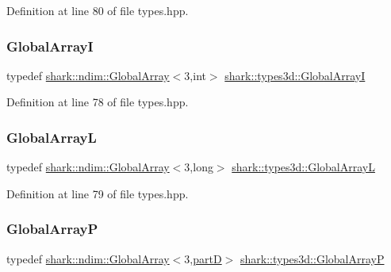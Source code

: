 Definition at line 80 of file types.\+hpp.

\hypertarget{namespaceshark_1_1types3d_a7f31ca9637cd289d819d1d736513dfc0}{}\label{namespaceshark_1_1types3d_a7f31ca9637cd289d819d1d736513dfc0} 
\subsubsection{\texorpdfstring{Global\+ArrayI}{GlobalArrayI}}
{\footnotesize\ttfamily typedef \hyperlink{classshark_1_1ndim_1_1_global_array}{shark\+::ndim\+::\+Global\+Array}$<$3,int$>$ \hyperlink{namespaceshark_1_1types3d_a7f31ca9637cd289d819d1d736513dfc0}{shark\+::types3d\+::\+Global\+ArrayI}}



Definition at line 78 of file types.\+hpp.

\hypertarget{namespaceshark_1_1types3d_a931d8d19c72c6e4deb52443dd3fa4c3f}{}\label{namespaceshark_1_1types3d_a931d8d19c72c6e4deb52443dd3fa4c3f} 
\subsubsection{\texorpdfstring{Global\+ArrayL}{GlobalArrayL}}
{\footnotesize\ttfamily typedef \hyperlink{classshark_1_1ndim_1_1_global_array}{shark\+::ndim\+::\+Global\+Array}$<$3,long$>$ \hyperlink{namespaceshark_1_1types3d_a931d8d19c72c6e4deb52443dd3fa4c3f}{shark\+::types3d\+::\+Global\+ArrayL}}



Definition at line 79 of file types.\+hpp.

\hypertarget{namespaceshark_1_1types3d_ad2ba10d502326eab75658f1866c951fe}{}\label{namespaceshark_1_1types3d_ad2ba10d502326eab75658f1866c951fe} 
\subsubsection{\texorpdfstring{Global\+ArrayP}{GlobalArrayP}}
{\footnotesize\ttfamily typedef \hyperlink{classshark_1_1ndim_1_1_global_array}{shark\+::ndim\+::\+Global\+Array}$<$3,\hyperlink{namespaceshark_1_1types3d_a8ba1ca83346f7674ce78342d0dc516ce}{partD}$>$ \hyperlink{namespaceshark_1_1types3d_ad2ba10d502326eab75658f1866c951fe}{shark\+::types3d\+::\+Global\+ArrayP}}



